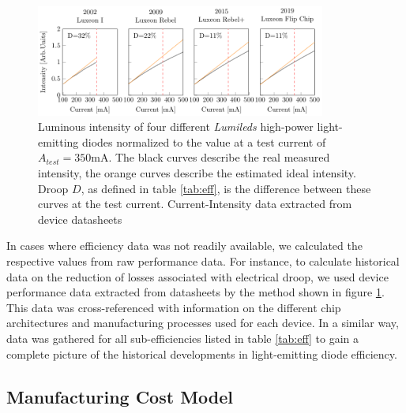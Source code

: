 \documentclass[a4paper,nocompress]{spie}  %
\begin{document}
        \begin{figure} [ht]
            \begin{center}
                \includegraphics[width=0.85\textwidth]{SPIE/article/droop_lumileds.pdf}
            \end{center}
            \caption{Luminous intensity of four different \textit{Lumileds} high-power light-emitting diodes normalized to the value at a test current of $A_{test}=350$mA. The black curves describe the real measured intensity, the orange curves describe the estimated ideal intensity. Droop $D$, as defined in table \ref{tab:eff}, is the difference between these curves at the test current. Current-Intensity data extracted from device datasheets \cite{datasheet_lumileds_lux1,datasheet_lumileds_rebel,datasheet_lumileds_rebplus,lumi2019data}}
            \label{fig:droop}
        \end{figure}
        
        In cases where efficiency data was not readily available, we calculated the respective values from raw performance data. For instance, to calculate historical data on the reduction of losses associated with electrical droop, we used device performance data extracted from datasheets by the method shown in figure \ref{fig:droop}. This data was cross-referenced with information on the different chip architectures and manufacturing processes used for each device. In a similar way, data was gathered for all sub-efficiencies listed in table \ref{tab:eff} to gain a complete picture of the historical developments in light-emitting diode efficiency.

    \subsection{Manufacturing Cost Model}
    \label{subsec:costmodel}
    
\end{document}
